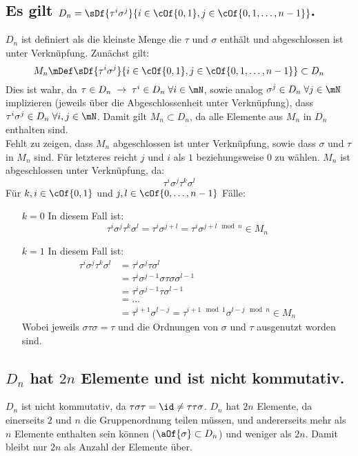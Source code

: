 \subsection{Es gilt $D_n = \sDf{\tau^i\sigma^j}{i\in\cOf{0,1}, j\in\cOf{0,1,\dots,n-1}}$.}
$D_n$ ist definiert als die kleinste Menge die $\tau$ und $\sigma$ enthält und abgeschlossen ist unter Verknüpfung. Zunächst gilt:
\begin{equation}
	M_n \mDef \sDf{\tau^i\sigma^j}{i\in\cOf{0,1}, j\in\cOf{0,1,\dots,n-1}} \subset D_n
\end{equation}
Dies ist wahr, da $\tau\in D_n\;\rightarrow\;\tau^i\in D_n\;\forall i \in \mN$, sowie analog $\sigma^j\in D_n\;\forall j \in \mN$ implizieren (jeweils über die Abgeschlossenheit unter Verknüpfung), dass $\tau^i\sigma^j\in D_n\;\forall i,j\in\mN$. Damit gilt $M_n \subset D_n$, da alle Elemente aus $M_n$ in $D_n$ enthalten sind.\\
Fehlt zu zeigen, dass $M_n$ abgeschlossen ist unter Verknüpfung, sowie dass $\sigma$ und $\tau$ in $M_n$ sind. Für letzteres reicht $j$ und $i$ als $1$ beziehungsweise $0$ zu wählen. $M_n$ ist abgeschlossen unter Verknüpfung, da:
\begin{equation}
	\tau^i\sigma^j\tau^k\sigma^l
\end{equation}
Für $k,i\in\cOf{0,1}$ und $j,l\in\cOf{0,\dots,n-1}$ Fälle:
\begin{enumerate}
	\item[$k=0$] In diesem Fall ist:
	\begin{equation}
		\tau^i\sigma^j\tau^k\sigma^l = \tau^i\sigma^{j+l} = \tau^i\sigma^{j+l \mod n} \in M_n
	\end{equation}
	\item[$k=1$] In diesem Fall ist:
	\begin{align}
		\tau^i\sigma^j\tau^k\sigma^l & = \tau^i\sigma^j\tau\sigma^l\\
		& = \tau^i\sigma^{j-1}\sigma\tau\sigma\sigma^{l-1}\\
		& = \tau^i\sigma^{j-1}\tau\sigma^{l-1}\\
		& = \dots \\
		& = \tau^{i+1}\sigma^{l-j} = \tau^{i+1 \mod 1}\sigma^{l-j \mod n} \in M_n
	\end{align}
	Wobei jeweils $\sigma\tau\sigma = \tau$ und die Ordnungen von $\sigma$ und $\tau$ ausgenutzt worden sind.
\end{enumerate}

\subsection{$D_n$ hat $2n$ Elemente und ist nicht kommutativ.}
$D_n$ ist nicht kommutativ, da $\tau\sigma\tau = \id \neq \tau\tau\sigma$. $D_n$ hat $2n$ Elemente, da einerseits $2$ und $n$ die Gruppenordnung teilen müssen, und andererseits mehr als $n$ Elemente enthalten sein können ($\aOf{\sigma} \subset D_n$) und weniger als $2n$. Damit bleibt nur $2n$ als Anzahl der Elemente über.
